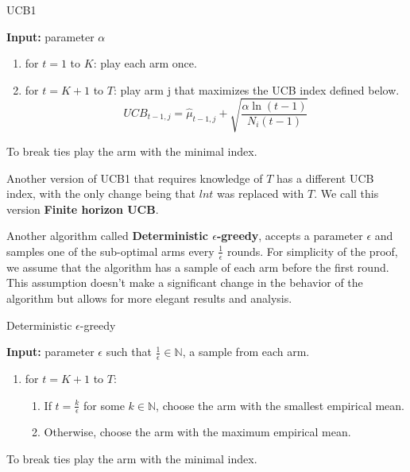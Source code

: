 \documentclass[opre,nonblindrev]{informs3} %
\begin{document}
\begin{algorithm}
\caption{UCB1}
\textbf{Input:} parameter $\alpha$ 
\begin{enumerate}
    \item for $t = 1$ to $K$: play each arm once.
    \item for $t = K+1$ to $T$: play arm j that maximizes the UCB index defined below. $$UCB_{t-1,j} = \hat{\mu}_{t-1,j} + \sqrt{\frac{\alpha\ln{(t-1)}}{N_i(t-1)}}$$
\end{enumerate}
To break ties play the arm with the minimal index.
\end{algorithm}

Another version of UCB1 that requires knowledge of $T$ has a different UCB index, with the only change being that $lnt$ was replaced with $T$. We call this version \textbf{Finite horizon UCB}.

Another algorithm called \textbf{Deterministic $\epsilon$-greedy}, accepts a parameter $\epsilon$ and samples one of the sub-optimal arms every $\frac{1}{\epsilon}$ rounds. For simplicity of the proof, we assume that the algorithm has a sample of each arm before the first round. This assumption doesn't make a significant change in the behavior of the algorithm but allows for more elegant results and analysis.
\begin{algorithm}
\caption{Deterministic $\epsilon$-greedy}
\textbf{Input:} parameter $\epsilon$ such that $\frac{1}{\epsilon}\in \mathbb{N}$, a sample from each arm.
\begin{enumerate}
    \item for $t = K+1$ to $T$:
    \begin{enumerate}
        \item If $t = \frac{k}{\epsilon}$ for some $k\in \mathbb{N}$, choose the arm with the smallest empirical mean.
        \item Otherwise, choose the arm with the maximum empirical mean.
    \end{enumerate}
\end{enumerate}
To break ties play the arm with the minimal index.
\end{algorithm}
\end{document}
